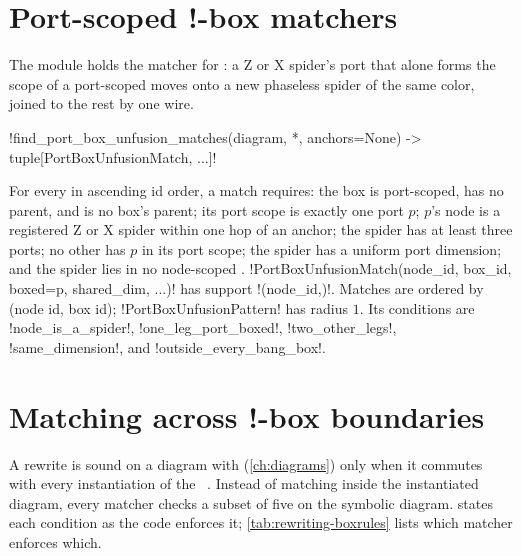 \section{Port-scoped !-box matchers}\label{sec:rewriting-box}

The module  holds the matcher for :
a Z or X spider's port that alone forms the scope of a port-scoped \bbox{} moves onto a new
phaseless spider of the same color, joined to the rest by one wire.

\begin{signature}
\py!find_port_box_unfusion_matches(diagram, *, anchors=None) -> tuple[PortBoxUnfusionMatch, ...]!
\end{signature}
For every \bbox{} in ascending id order, a match requires: the box is port-scoped, has no parent,
and is no box's parent; its port scope is exactly one port $p$; $p$'s node is a registered Z or X
spider within one hop of an anchor; the spider has at least three ports; no other \bbox{} has $p$
in its port scope; the spider has a uniform port dimension; and the spider lies in no node-scoped
\bbox{}. \py!PortBoxUnfusionMatch(node_id, box_id, boxed=p, shared_dim, ...)! has support
\py!(node_id,)!. Matches are ordered by (node id, box id); \py!PortBoxUnfusionPattern! has radius
$1$. Its conditions are \code!node_is_a_spider!, \code!one_leg_port_boxed!,
\code!two_other_legs!, \code!same_dimension!, and \code!outside_every_bang_box!.

\section{Matching across !-box boundaries}\label{sec:rewriting-boxcond}

A rewrite is sound on a diagram with \bboxes{} (\cref{ch:diagrams}) only when it commutes with
every instantiation of the \bboxes{}~\cite{dixon2009graphical,kissinger2014pattern}. Instead of
matching inside the instantiated diagram, every matcher checks a subset of five  on the symbolic diagram.  states each condition as the code
enforces it; \cref{tab:rewriting-boxrules} lists which matcher enforces which.

